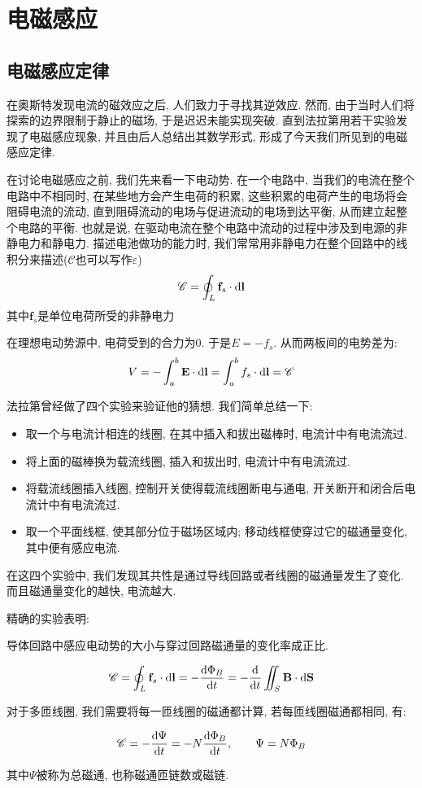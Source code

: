 \chapter{电磁感应}
\section{电磁感应定律}
在奥斯特发现电流的磁效应之后, 人们致力于寻找其逆效应. 然而, 由于当时人们将探索的边界限制于静止的磁场, 于是迟迟未能实现突破. 直到法拉第用若干实验发现了电磁感应现象, 并且由后人总结出其数学形式, 形成了今天我们所见到的电磁感应定律.

在讨论电磁感应之前, 我们先来看一下电动势. 在一个电路中, 当我们的电流在整个电路中不相同时, 在某些地方会产生电荷的积累, 这些积累的电荷产生的电场将会阻碍电流的流动, 直到阻碍流动的电场与促进流动的电场到达平衡, 从而建立起整个电路的平衡. 也就是说, 在驱动电流在整个电路中流动的过程中涉及到电源的非静电力和静电力. 描述电池做功的能力时, 我们常常用非静电力在整个回路中的线积分来描述($\mathscr C$也可以写作$\varepsilon$)\[
\mathscr C = \oint_L  \mathbf{f}_s \cdot \mathop{}\!\mathrm{d} \mathbf{l}
\]
其中$\mathbf f_s$是单位电荷所受的非静电力

在理想电动势源中, 电荷受到的合力为$0$. 于是$E=-f_s$. 从而两板间的电势差为:
\[
V=-\int_a^b \mathbf{E} \cdot \mathop{}\!\mathrm{d} \mathbf{l} = \int_a^b f_s \cdot \mathop{}\!\mathrm{d} \mathbf{l} = \mathscr C
\]

法拉第曾经做了四个实验来验证他的猜想. 我们简单总结一下:
\begin{itemize}
  \item 取一个与电流计相连的线圈, 在其中插入和拔出磁棒时, 电流计中有电流流过.
  \item 将上面的磁棒换为载流线圈, 插入和拔出时, 电流计中有电流流过.
  \item 将载流线圈插入线圈, 控制开关使得载流线圈断电与通电, 开关断开和闭合后电流计中有电流流过.
  \item 取一个平面线框, 使其部分位于磁场区域内; 移动线框使穿过它的磁通量变化, 其中便有感应电流.
\end{itemize}

在这四个实验中, 我们发现其共性是通过导线回路或者线圈的磁通量发生了变化. 而且磁通量变化的越快, 电流越大.

精确的实验表明:

\begin{theorem}[法拉第电磁感应定律]
导体回路中感应电动势的大小与穿过回路磁通量的变化率成正比.

\[
\mathscr C =\oint_L \mathbf{f}_s\cdot\mathop{}\!\mathrm{d}\mathbf l =-\frac{\mathop{}\!\mathrm{d} \Phi_B}{\mathop{}\!\mathrm{d} t} =-\frac{\mathop{}\!\mathrm{d}}{\mathop{}\!\mathrm{d} t}\iint_S \mathbf{B} \cdot \mathop{}\!\mathrm{d} \mathbf{S}
\]

对于多匝线圈, 我们需要将每一匝线圈的磁通都计算, 若每匝线圈磁通都相同, 有:

\[
\mathscr C = -\frac{\mathop{}\!\mathrm{d} \Psi}{\mathop{}\!\mathrm{d} t} =-N\frac{\mathop{}\!\mathrm{d} \Phi_B}{\mathop{}\!\mathrm{d} t},\qquad \Psi=N\Phi_B
\]
\end{theorem}
其中$\Psi$被称为总磁通, 也称磁通匝链数或磁链.


